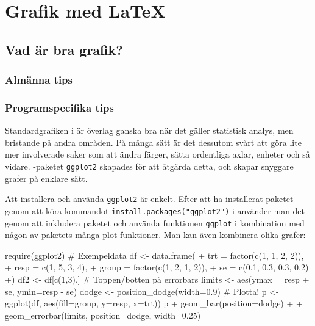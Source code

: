\documentclass[../../a4.tex]{subfiles}
\begin{document}
\section{Grafik med \LaTeX}\label{sec:4}

\subsection{Vad är bra grafik?}
\subsubsection{Almänna tips}
\subsubsection{Programspecifika tips}
\label{sec:ggplot2}
Standardgrafiken i \Rlogo är överlag ganska bra när det gäller statistisk
analys, men bristande på andra områden. På många sätt är det dessutom svårt
att göra lite mer involverade saker som att ändra färger, sätta ordentliga
axlar, enheter och så vidare. \Rlogo-paketet \texttt{ggplot2}
skapades för att åtgärda detta, och skapar snyggare grafer på enklare sätt.


Att installera och använda \texttt{ggplot2} är enkelt. Efter att ha installerat
paketet genom att köra kommandot \verb|install.packages("ggplot2")| i \Rlogo
använder man det genom att inkludera paketet och använda funktionen
\texttt{ggplot} i kombination med någon av paketets många plot-funktioner.
Man kan även kombinera olika grafer:
\begin{rcode}
require(ggplot2)
# Exempeldata
df <- data.frame(
+   trt = factor(c(1, 1, 2, 2)),
+   resp = c(1, 5, 3, 4), 
+   group = factor(c(1, 2, 1, 2)),
+   se = c(0.1, 0.3, 0.3, 0.2)
+) 
df2 <- df[c(1,3),] 
# Toppen/botten på errorbars
limits <- aes(ymax = resp + se, ymin=resp - se)
dodge <- position_dodge(width=0.9)
# Plotta!
p <- ggplot(df, aes(fill=group, y=resp, x=trt))
p + geom_bar(position=dodge) +
  + geom_errorbar(limits, position=dodge, width=0.25)
\end{rcode}
\end{document}
